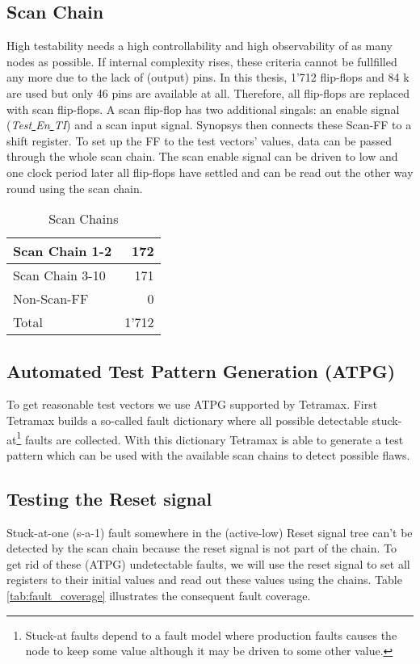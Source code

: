 \subsection{Scan Chain}
High testability needs a high controllability and high observability of as many nodes as possible. If internal complexity rises, these criteria cannot be fullfilled any more due to the lack of (output) pins. In this thesis, 1'712 flip-flops and 84 k are used but only 46 pins are available at all. Therefore, all flip-flops are replaced with scan flip-flops. A scan flip-flop has two additional singals: an enable signal (\textit{Test\underline{ }En\underline{ }TI}) and a scan input signal. Synopsys then connects these Scan-FF to a shift register. To set up the FF to the test vectors' values, data can be passed through the whole scan chain. The scan enable signal can be driven to low and one clock period later all flip-flops have settled and can be read out the other way round using the scan chain. \\

\begin{table}[htbp]
 \caption{Scan Chains}
 \label{tab:scan_chain}
 \centering\begin{tabular}{|l|r|} \hline
Scan Chain 1-2 & 172 \\ \hline
Scan Chain 3-10 & 171 \\ \hline
Non-Scan-FF & 0 \\ \hline
Total & 1'712 \\ \hline
 \end{tabular}
\end{table}


\subsection{Automated Test Pattern Generation (ATPG)}
To get reasonable test vectors we use ATPG supported by Tetramax. First Tetramax builds a so-called fault dictionary where all possible detectable stuck-at\footnote{Stuck-at faults depend to a fault model where production faults causes the node to keep some value although it may be driven to some other value.\cite{vlsi3}} faults are collected. With this dictionary Tetramax is able to generate a test pattern which can be used with the available scan chains to detect possible flaws. 




\subsection{Testing the Reset signal}
Stuck-at-one (s-a-1) fault somewhere in the (active-low) Reset signal tree can't be detected by the scan chain because the reset signal is not part of the chain. To get rid of these (ATPG) undetectable faults, we will use the reset signal to set all registers to their initial values and read out these values using the chains. Table \ref{tab:fault_coverage} illustrates the consequent fault coverage.

